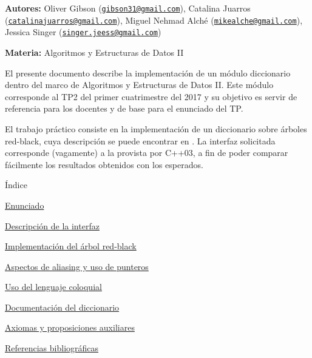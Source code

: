 
\begin{DoxyItemize}
\item {\bfseries Autores\-:} Oliver Gibson (\href{mailto:gibson31@gmail.com}{\tt gibson31@gmail.\-com}), Catalina Juarros (\href{mailto:catalinajuarros@gmail.com}{\tt catalinajuarros@gmail.\-com}), Miguel Nehmad Alché (\href{mailto:mikealche@gmail.com}{\tt mikealche@gmail.\-com}), Jessica Singer (\href{mailto:singer.jeess@gmail.com}{\tt singer.\-jeess@gmail.\-com})
\item {\bfseries Materia\-:} Algoritmos y Estructuras de Datos I\-I
\end{DoxyItemize}

El presente documento describe la implementación de un módulo diccionario dentro del marco de Algoritmos y Estructuras de Datos I\-I. Este módulo corresponde al T\-P2 del primer cuatrimestre del 2017 y su objetivo es servir de referencia para los docentes y de base para el enunciado del T\-P.

El trabajo práctico consiste en la implementación de un diccionario sobre árboles red-\/black, cuya descripción se puede encontrar en \cite{CormenLeisersonRivestStein2009}. La interfaz solicitada corresponde (vagamente) a la provista por C++03, a fin de poder comparar fácilmente los resultados obtenidos con los esperados.

\begin{DoxyParagraph}{Índice}

\end{DoxyParagraph}

\begin{DoxyItemize}
\item \hyperlink{Enunciado}{Enunciado}
\item \hyperlink{Interfaz}{Descripción de la interfaz}
\item \hyperlink{Implementacion}{Implementación del árbol red-\/black}
\item \hyperlink{Aliasing}{Aspectos de aliasing y uso de punteros}
\item \hyperlink{Castellano}{Uso del lenguaje coloquial}
\item \hyperlink{classaed2_1_1map}{Documentación del diccionario }
\item \hyperlink{axiomas}{Axiomas y proposiciones auxiliares}
\item \hyperlink{citelist}{Referencias bibliográficas} 
\end{DoxyItemize}